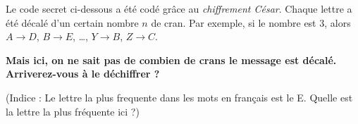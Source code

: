 \documentclass{exos}
\begin{document}
Le code secret ci-dessous a été codé grâce au \textit{chiffrement César}. Chaque lettre a été décalé d'un certain nombre $n$ de cran. Par exemple, si le nombre est $3$, alors $A \to D$, $B \to E$, \dots, $Y \to B$, $Z \to C$.

\textbf{Mais ici, on ne sait pas de combien de crans le message est décalé. Arriverez-vous à le déchiffrer ?}

\vspace*{1cm}


\vspace*{1cm}

(Indice : Le lettre la plus frequente dans les mots en français est le E. Quelle est la lettre la plus fréquente ici ?)
\end{document}
